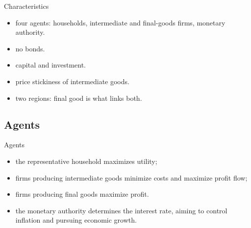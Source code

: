 \documentclass[../quali_slides.tex]{subfiles}
\begin{document}

\begin{frame}{Characteristics}
	
	\begin{itemize}
		
		\item four agents: households, intermediate and final-goods firms, monetary authority.
		
		\item no bonds.
		
		\item capital and investment.
		
		\item price stickiness of intermediate goods.
		
		\item two regions: final good is what links both.
		
	\end{itemize}
	
\end{frame}
	

	\subsection{Agents}
	
	\begin{frame}{Agents}

	\begin{itemize}
	
	\item the representative household maximizes utility;
	
	\item firms producing intermediate goods minimize costs and maximize profit flow;
	
	\item firms producing final goods maximize profit.

	\item the monetary authority determines the interest rate, aiming to control inflation and pursuing economic growth.
	
	\end{itemize}		

	\end{frame}
\end{document}
